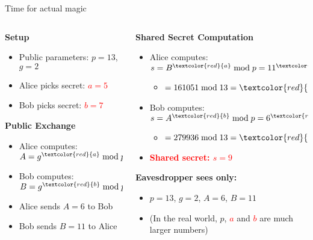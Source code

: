 \documentclass[aspectratio=169, lualatex, handout]{beamer}
\begin{document}
\begin{frame}{Time for actual magic}
	\begin{columns}[c]
		\begin{column}{0.5\textwidth}
			\textbf{Setup}
			\begin{itemize}[<+->]
				\item Public parameters: $p = 13$, $g = 2$
				\item Alice picks secret: \textcolor{red}{$a = 5$}
				\item Bob picks secret: \textcolor{red}{$b = 7$}
			\end{itemize}
			\pause
			\vspace{0.5cm}
			\textbf{Public Exchange}
			\begin{itemize}[<+->]
				\item Alice computes: $A = g^{\textcolor{red}{a}} \bmod p = 6$
				\item Bob computes: $B = g^{\textcolor{red}{b}} \bmod p = 11$
				\item Alice sends $A = 6$ to Bob
				\item Bob sends $B = 11$ to Alice
			\end{itemize}
		\end{column}
		\begin{column}{0.5\textwidth}
			\pause
			\textbf{Shared Secret Computation}
			\begin{itemize}[<+->]
				\item Alice computes: $s = B^{\textcolor{red}{a}} \bmod p = 11^{\textcolor{red}{5}} \bmod 13$
				      \begin{itemize}
					      \item $= 161051 \bmod 13 = \textcolor{red}{9}$
				      \end{itemize}
				\item Bob computes: $s = A^{\textcolor{red}{b}} \bmod p = 6^{\textcolor{red}{7}} \bmod 13$
				      \begin{itemize}
					      \item $= 279936 \bmod 13 = \textcolor{red}{9}$
				      \end{itemize}
				\item \textcolor{red}{\textbf{Shared secret: $s = 9$}}
			\end{itemize}
			\pause
			\vspace{0.5cm}
			\textbf{Eavesdropper sees only:}
			\begin{itemize}[<+->]
				\item $p = 13$, $g = 2$, $A = 6$, $B = 11$
				\item (In the real world, $p$, \textcolor{red}{$a$} and \textcolor{red}{$b$} are much larger numbers)
			\end{itemize}
		\end{column}
	\end{columns}
\end{frame}
\end{document}
